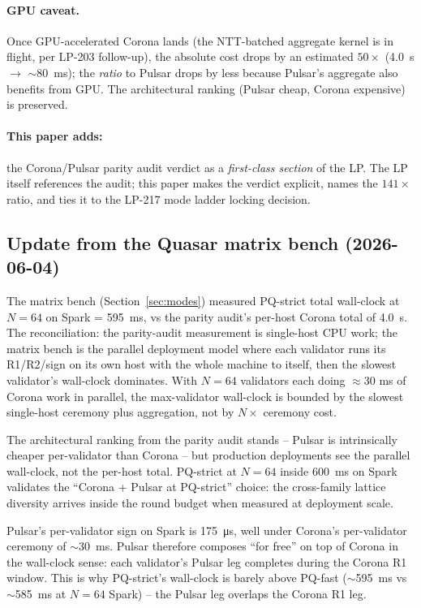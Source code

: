 \paragraph{GPU caveat.} Once GPU-accelerated Corona lands (the
NTT-batched aggregate kernel is in flight, per LP-203 follow-up),
the absolute cost drops by an estimated $50\times$
(\SI{4.0}{\second} $\to$ $\sim$\SI{80}{\milli\second}); the
\emph{ratio} to Pulsar drops by less because Pulsar's aggregate
also benefits from GPU. The architectural ranking (Pulsar cheap,
Corona expensive) is preserved.

\paragraph{This paper adds:} the Corona/Pulsar parity audit verdict
as a \emph{first-class section} of the LP. The LP itself references
the audit; this paper makes the verdict explicit, names the
$141\times$ ratio, and ties it to the LP-217 mode ladder locking
decision.

\subsection{Update from the Quasar matrix bench (2026-06-04)}

The matrix bench (Section~\ref{sec:modes}) measured PQ-strict
total wall-clock at $N{=}64$ on Spark = \SI{595}{ms}, vs the parity
audit's per-host Corona total of \SI{4.0}{s}. The reconciliation:
the parity-audit measurement is single-host CPU work; the matrix
bench is the parallel deployment model where each validator runs
its R1/R2/sign on its own host with the whole machine to itself,
then the slowest validator's wall-clock dominates. With $N{=}64$
validators each doing $\approx 30$ ms of Corona work in parallel,
the max-validator wall-clock is bounded by the slowest single-host
ceremony plus aggregation, not by $N \times$ ceremony cost.

The architectural ranking from the parity audit stands -- Pulsar is
intrinsically cheaper per-validator than Corona -- but production
deployments see the parallel wall-clock, not the per-host total.
PQ-strict at $N{=}64$ inside \SI{600}{ms} on Spark validates the
``Corona + Pulsar at PQ-strict'' choice: the cross-family lattice
diversity arrives inside the round budget when measured at
deployment scale.

Pulsar's per-validator sign on Spark is \SI{175}{\micro\second}, well
under Corona's per-validator ceremony of $\sim$\SI{30}{ms}. Pulsar
therefore composes ``for free'' on top of Corona in the wall-clock
sense: each validator's Pulsar leg completes during the Corona R1
window. This is why PQ-strict's wall-clock is barely above PQ-fast
($\sim$\SI{595}{ms} vs $\sim$\SI{585}{ms} at $N{=}64$ Spark) --
the Pulsar leg overlaps the Corona R1 leg.
